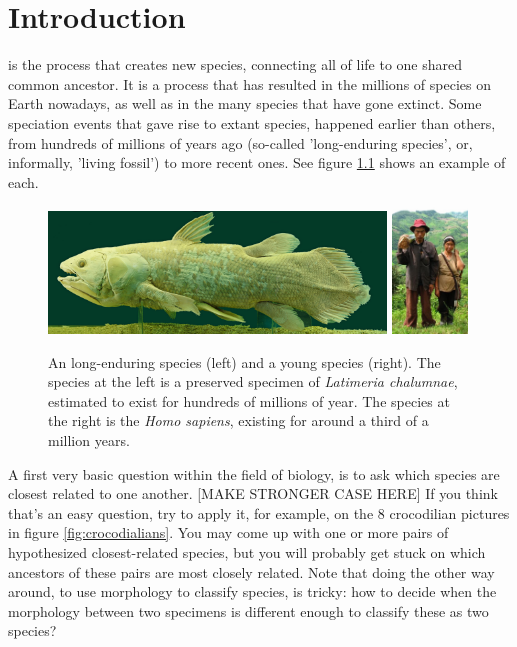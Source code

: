 \chapter{Introduction}
\label{chapter_introduction}
\newpage

\noindent 
{} is the process that creates new species,
connecting all of life to one shared common ancestor. It is a process
that has resulted in the millions of species on Earth nowadays, 
as well as in the many species that have gone extinct.
Some speciation events that gave rise to extant species, 
happened earlier than others,
from hundreds of millions of years ago (so-called 'long-enduring species',
or, informally, 'living fossil') 
to more recent ones. See figure \ref{fig:long_enduring_and_young_species} 
shows an example of each.

\begin{figure}[H]
  \includegraphics[width=0.80\textwidth]{latimeria_chalumnae.jpg}
  \includegraphics[width=0.18\textwidth]{homo_sapiens.jpg}
  \caption{
    An long-enduring species (left) and a young species (right).
    The species at the left is a preserved specimen of \textit{Latimeria chalumnae}, 
    estimated to exist for hundreds of millions of year.
    The species at the right is the \textit{Homo sapiens}, 
    existing for around a third of a million years.
  }
  \label{fig:long_enduring_and_young_species}
\end{figure}

A first very basic question within the field of biology,
is to ask which species are closest related to
one another. 
[MAKE STRONGER CASE HERE]
If you think that's an easy question, try to apply it, 
for example, on the 8 crocodilian pictures in figure \ref{fig:crocodialians}.
You may come up with one or more pairs of hypothesized closest-related species,
but you will probably get stuck on which ancestors of these pairs
are most closely related. Note that doing the other way around, to use
morphology to classify species, is tricky: how to decide when the morphology 
between two specimens is different enough to classify these as two species?

